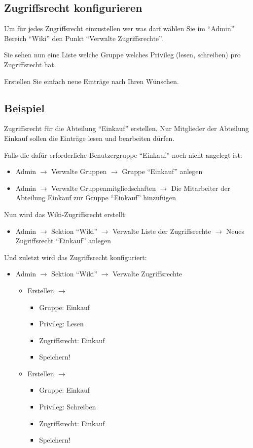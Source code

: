 \documentclass[article, a4paper, oneside, 11pt]{memoir}
\begin{document}
\subsection{Zugriffsrecht konfigurieren}
Um für jedes Zugriffsrecht einzustellen wer was darf wählen Sie im "`Admin"' Bereich "`Wiki"' den Punkt "`Verwalte Zugriffsrechte"'.

Sie sehen nun eine Liste welche Gruppe welches Privileg (lesen, schreiben) pro Zugriffsrecht hat.

Erstellen Sie einfach neue Einträge nach Ihren Wünschen.

\subsection{Beispiel}
Zugriffsrecht für die Abteilung "`Einkauf"' erstellen. Nur Mitglieder der Abteilung Einkauf sollen die Einträge lesen und bearbeiten dürfen.

Falls die dafür erforderliche Benutzergruppe "`Einkauf"' noch nicht angelegt ist:
\begin{itemize}
 \item Admin $\rightarrow$ Verwalte Gruppen $\rightarrow$ Gruppe "`Einkauf"' anlegen
 \item Admin $\rightarrow$ Verwalte Gruppenmitgliedschaften $\rightarrow$ Die Mitarbeiter der Abteilung Einkauf zur Gruppe "`Einkauf"' hinzufügen
\end{itemize}

Nun wird das Wiki-Zugriffsrecht erstellt:
\begin{itemize}
 \item Admin $\rightarrow$ Sektion "`Wiki"' $\rightarrow$ Verwalte Liste der Zugriffsrechte $\rightarrow$ Neues Zugriffsrecht "`Einkauf"' anlegen
\end{itemize}

Und zuletzt wird das Zugriffsrecht konfiguriert:
\begin{itemize}
 \item Admin $\rightarrow$ Sektion "`Wiki"' $\rightarrow$ Verwalte Zugriffsrechte
 \begin{itemize}
  \item Erstellen $\rightarrow$ 
  \begin{itemize}
   \item Gruppe: Einkauf
   \item Privileg: Lesen
   \item Zugriffsrecht: Einkauf
   \item Speichern!
  \end{itemize}
  \item Erstellen $\rightarrow$ 
  \begin{itemize}
   \item Gruppe: Einkauf
   \item Privileg: Schreiben
   \item Zugriffsrecht: Einkauf
   \item Speichern!
  \end{itemize}
 \end{itemize}
\end{itemize}
\end{document}
